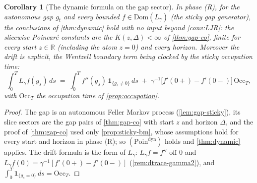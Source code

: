 \documentclass[reqno,final,11pt]{amsart}
\theoremstyle{plain}
\newtheorem{corollary}[theorem]{Corollary}
\theoremstyle{definition}
\theoremstyle{remark}
\newcommand{\R}{\mathbb R}
\newcommand{\Dom}{\mathrm{Dom}}
\begin{document}
\begin{corollary}[The dynamic formula on the gap sector]\label{cor:dynamic-gap}
In phase \textnormal{(R)}, for the autonomous gap $g_t$ and every bounded
$f\in\Dom(L_\gamma)$ (the sticky gap generator), the conclusions of
\cref{thm:dynamic} hold with no input beyond \cref{conv:LJR}: the slicewise Poincar\'e
constants are the $\bar K(z,\Delta)<\infty$ of \cref{thm:gap-co}, finite for
every start $z\in\R$ (including the atom $z=0$) and every horizon. Moreover
the drift is explicit, the Wentzell boundary term being clocked by the sticky
occupation time:
\[
  \int_0^TL_\gamma f(g_s)\,ds
  \;=\;\int_0^Tf''(g_s)\,\mathbf 1_{\{g_s\neq0\}}\,ds
  \;+\;\gamma^{-1}\bigl[f'(0{+})-f'(0{-})\bigr]\,\mathrm{Occ}_T ,
\]
with $\mathrm{Occ}_T$ the occupation time of \cref{prop:occupation}.
\end{corollary}
\begin{proof}
The gap is an autonomous Feller Markov process (\cref{lem:gap-sticky}), its
slice sectors are the gap pairs of \cref{thm:gap-co} with start $z$ and
horizon $\Delta$, and the proof of \cref{thm:gap-co} used only
\cref{prop:sticky-bm}, whose assumptions hold for every start and horizon in
phase \textnormal{(R)}; so $(\mathrm{Poin}^{\mathrm{dyn}})$ holds and
\cref{thm:dynamic} applies. The drift formula is the form of $L_\gamma$:
$L_\gamma f=f''$ off $0$ and
$L_\gamma f(0)=\gamma^{-1}[f'(0{+})-f'(0{-})]$ (\cref{rem:dtrace-gamma2}),
and $\int_0^T\mathbf 1_{\{g_s=0\}}\,ds=\mathrm{Occ}_T$.
\end{proof}
\end{document}
